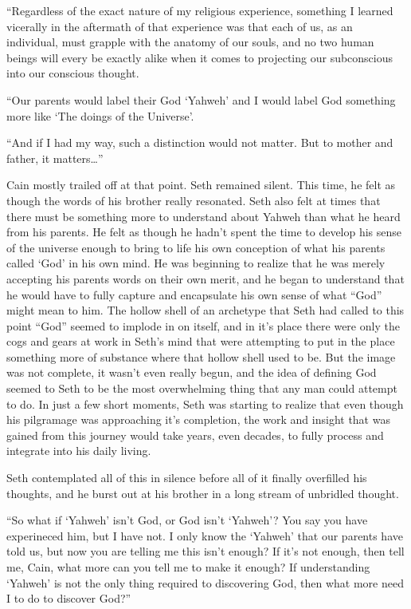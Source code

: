 \documentclass[12pt,twoside,titlepage]{report}
\begin{document}
``Regardless of the exact nature of my religious experience, something I
learned vicerally in the aftermath of that experience was that each of
us, as an individual, must grapple with the anatomy of our souls, and no
two human beings will every be exactly alike when it comes to projecting
our subconscious into our conscious thought.

``Our parents would label their God `Yahweh' and I would label God
something more like `The doings of the Universe'.

``And if I had my way, such a distinction would not matter. But to
mother and father, it matters\ldots{}''

Cain mostly trailed off at that point. Seth remained silent. This time,
he felt as though the words of his brother really resonated. Seth also
felt at times that there must be something more to understand about
Yahweh than what he heard from his parents. He felt as though he hadn't
spent the time to develop his sense of the universe enough to bring to
life his own conception of what his parents called `God' in his own
mind. He was beginning to realize that he was merely accepting his
parents words on their own merit, and he began to understand that he
would have to fully capture and encapsulate his own sense of what
``God'' might mean to him. The hollow shell of an archetype that Seth
had called to this point ``God'' seemed to implode in on itself, and in
it's place there were only the cogs and gears at work in Seth's mind
that were attempting to put in the place something more of substance
where that hollow shell used to be. But the image was not complete, it
wasn't even really begun, and the idea of defining God seemed to Seth to
be the most overwhelming thing that any man could attempt to do. In just
a few short moments, Seth was starting to realize that even though his
pilgramage was approaching it's completion, the work and insight that
was gained from this journey would take years, even decades, to fully
process and integrate into his daily living.

Seth contemplated all of this in silence before all of it finally
overfilled his thoughts, and he burst out at his brother in a long
stream of unbridled thought.

``So what if `Yahweh' isn't God, or God isn't `Yahweh'? You say you have
experineced him, but I have not. I only know the `Yahweh' that our
parents have told us, but now you are telling me this isn't enough? If
it's not enough, then tell me, Cain, what more can you tell me to make
it enough? If understanding `Yahweh' is not the only thing required to
discovering God, then what more need I to do to discover God?''
\end{document}
